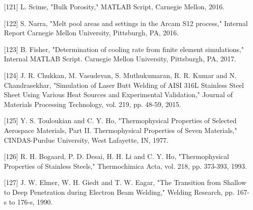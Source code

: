 \documentclass[10pt]{article}
\begin{document}
[121] L. Scime, "Bulk Porosity," MATLAB Script, Carnegie Mellon, 2016.

[122] S. Narra, "Melt pool areas and settings in the Arcam S12 process," Internal Report Carnegie Mellon University, Pittsburgh, PA, 2016.

[123] B. Fisher, "Determination of cooling rate from finite element simulations," Internal MATLAB Script. Carnegie Mellon University, Pittsburgh, PA, 2017.

[124] J. R. Chukkan, M. Vasudevan, S. Muthukumaran, R. R. Kumar and N. Chandrasekhar, "Simulation of Laser Butt Welding of AISI 316L Stainless Steel Sheet Using Various Heat Sources and Experimental Validation," Journal of Materials Processing Technology, vol. 219, pp. 48-59, 2015.

[125] Y. S. Touloukian and C. Y. Ho, "Thermophysical Properties of Selected Aerospace Materials, Part II. Thermophysical Properties of Seven Materials," CINDAS-Purdue University, West Lafayette, IN, 1977.

[126] R. H. Bogaard, P. D. Desai, H. H. Li and C. Y. Ho, "Thermophysical Properties of Stainless Steels," Thermochimica Acta, vol. 218, pp. 373-393, 1993.

[127] J. W. Elmer, W. H. Giedt and T. W. Eagar, "The Transition from Shallow to Deep Penetration during Electron Beam Welding," Welding Research, pp. 167-s to 176-s, 1990.
\end{document}
